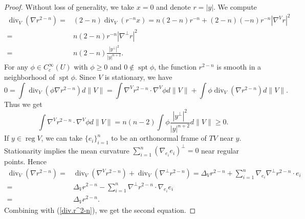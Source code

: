 \documentclass[10pt,a4paper]{amsart}
\DeclareMathOperator{\Div}{div}
\DeclareMathOperator{\reg}{reg}
\DeclareMathOperator{\spt}{spt}
\begin{document}
\begin{proof}
	Without loss of generality, we take $x=0$ and denote $r=|y|$. We compute
	\begin{equation}\label{div.r^2-n}
		\begin{aligned}
			\Div _V(\nabla r^{2-n})=&(2-n)\Div _V(r^{-n}x)=n(2-n)r^{-n}+(2-n)(-n)r^{-n}|\nabla ^Vr|^2\\
			=&n(2-n)r^{-n}|\nabla^\perp r|^2\\
			=&n(2-n)\frac{|y^\perp|^2}{|y|^{n+2}}.
		\end{aligned}
	\end{equation}
	For any $\phi\in C_c^\infty(U)$ with $\phi\ge0$ and $0\notin \spt \phi$, the function $r^{2-n}$ is smooth in a neighborhood of $\spt\phi$. Since $V$ is stationary, we have
	\[0=\int \Div _V(\phi\nabla r^{2-n})d\|V\|=\int \nabla^V r^{2-n}\cdot\nabla^V\phi d\|V\|+\int \phi \Div_V (\nabla r^{2-n})d\|V\|.\]
	Thus we get
	\[\int \nabla^V r^{2-n}\cdot\nabla^V\phi d\|V\|=n(n-2)\int \phi \frac{|y^\perp|^2}{|y|^{n+2}}d\|V\|\ge0.\]
	If $y\in \reg V$, we can take $\{e_i\}_{i=1}^n$ to be an orthonormal frame of $TV$ near $y$. Stationarity implies the mean curvature $\sum_{i=1}^n(\nabla_{e_i}e_i)^\perp=0$ near regular points. Hence
	\[\begin{aligned}
		\Div _V(\nabla r^{2-n})=&\Div _V(\nabla^V r^{2-n})+\Div _V(\nabla^\perp r^{2-n})=\Delta_Vr^{2-n}+\sum_{i=1}^n \nabla_{e_i}\nabla^\perp r^{2-n}\cdot e_i\\
		=&\Delta_Vr^{2-n}-\sum_{i=1}^n \nabla^\perp r^{2-n}\cdot \nabla_{e_i}e_i\\
		=&\Delta_Vr^{2-n}.
	\end{aligned}\]
	Combining with (\ref{div.r^2-n}), we get the second equation.
\end{proof}
\end{document}
